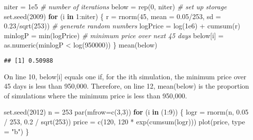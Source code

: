 \documentclass[
]{article}
\newenvironment{Shaded}{\begin{snugshade}}{\end{snugshade}}
\newcommand{\AttributeTok}[1]{\textcolor[rgb]{0.77,0.63,0.00}{#1}}
\newcommand{\CommentTok}[1]{\textcolor[rgb]{0.56,0.35,0.01}{\textit{#1}}}
\newcommand{\ControlFlowTok}[1]{\textcolor[rgb]{0.13,0.29,0.53}{\textbf{#1}}}
\newcommand{\DecValTok}[1]{\textcolor[rgb]{0.00,0.00,0.81}{#1}}
\newcommand{\FloatTok}[1]{\textcolor[rgb]{0.00,0.00,0.81}{#1}}
\newcommand{\FunctionTok}[1]{\textcolor[rgb]{0.00,0.00,0.00}{#1}}
\newcommand{\NormalTok}[1]{#1}
\newcommand{\OtherTok}[1]{\textcolor[rgb]{0.56,0.35,0.01}{#1}}
\newcommand{\SpecialCharTok}[1]{\textcolor[rgb]{0.00,0.00,0.00}{#1}}
\newcommand{\StringTok}[1]{\textcolor[rgb]{0.31,0.60,0.02}{#1}}
\begin{document}
\begin{Shaded}
\begin{Highlighting}[]
\NormalTok{niter }\OtherTok{=} \FloatTok{1e5} \CommentTok{\# number of iterations}
\NormalTok{below }\OtherTok{=} \FunctionTok{rep}\NormalTok{(}\DecValTok{0}\NormalTok{, niter) }\CommentTok{\# set up storage}
\FunctionTok{set.seed}\NormalTok{(}\DecValTok{2009}\NormalTok{)}
\ControlFlowTok{for}\NormalTok{ (i }\ControlFlowTok{in} \DecValTok{1}\SpecialCharTok{:}\NormalTok{niter)}
\NormalTok{\{}
\NormalTok{r }\OtherTok{=} \FunctionTok{rnorm}\NormalTok{(}\DecValTok{45}\NormalTok{, }\AttributeTok{mean =} \FloatTok{0.05}\SpecialCharTok{/}\DecValTok{253}\NormalTok{, }\AttributeTok{sd =} \FloatTok{0.23}\SpecialCharTok{/}\FunctionTok{sqrt}\NormalTok{(}\DecValTok{253}\NormalTok{)) }\CommentTok{\# generate random numbers}
\NormalTok{logPrice }\OtherTok{=} \FunctionTok{log}\NormalTok{(}\FloatTok{1e6}\NormalTok{) }\SpecialCharTok{+} \FunctionTok{cumsum}\NormalTok{(r)}
\NormalTok{minlogP }\OtherTok{=} \FunctionTok{min}\NormalTok{(logPrice) }\CommentTok{\# minimum price over next 45 days}
\NormalTok{below[i] }\OtherTok{=} \FunctionTok{as.numeric}\NormalTok{(minlogP }\SpecialCharTok{\textless{}} \FunctionTok{log}\NormalTok{(}\DecValTok{950000}\NormalTok{))}
\NormalTok{\}}
\FunctionTok{mean}\NormalTok{(below)}
\end{Highlighting}
\end{Shaded}

\begin{verbatim}
## [1] 0.50988
\end{verbatim}

On line 10, below{[}i{]} equals one if, for the ith simulation, the
minimum price over 45 days is less than 950,000. Therefore, on line 12,
mean(below) is the proportion of simulations where the minimum price is
less than 950,000.

\begin{Shaded}
\begin{Highlighting}[]
\FunctionTok{set.seed}\NormalTok{(}\DecValTok{2012}\NormalTok{)}
\NormalTok{n }\OtherTok{=} \DecValTok{253}
\FunctionTok{par}\NormalTok{(}\AttributeTok{mfrow=}\FunctionTok{c}\NormalTok{(}\DecValTok{3}\NormalTok{,}\DecValTok{3}\NormalTok{))}
\ControlFlowTok{for}\NormalTok{ (i }\ControlFlowTok{in}\NormalTok{ (}\DecValTok{1}\SpecialCharTok{:}\DecValTok{9}\NormalTok{))}
\NormalTok{\{}
\NormalTok{logr }\OtherTok{=} \FunctionTok{rnorm}\NormalTok{(n, }\FloatTok{0.05} \SpecialCharTok{/} \DecValTok{253}\NormalTok{, }\FloatTok{0.2} \SpecialCharTok{/} \FunctionTok{sqrt}\NormalTok{(}\DecValTok{253}\NormalTok{))}
\NormalTok{price }\OtherTok{=} \FunctionTok{c}\NormalTok{(}\DecValTok{120}\NormalTok{, }\DecValTok{120} \SpecialCharTok{*} \FunctionTok{exp}\NormalTok{(}\FunctionTok{cumsum}\NormalTok{(logr)))}
\FunctionTok{plot}\NormalTok{(price, }\AttributeTok{type =} \StringTok{"b"}\NormalTok{)}
\NormalTok{\}}
\end{Highlighting}
\end{Shaded}
\end{document}
